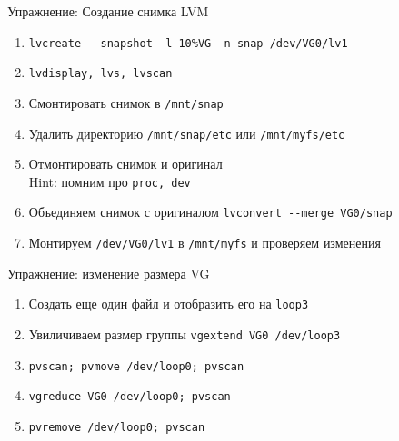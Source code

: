 \documentclass[ignorenonframetext, professionalfonts, hyperref={pdftex, unicode}]{beamer}
\begin{document}
\begin{frame}{Упражнение: Создание снимка LVM}
  \begin{enumerate}
    \item  {\tt lvcreate -\phantom{}-snapshot -l 10\%VG -n snap /dev/VG0/lv1}
    \item  {\tt lvdisplay, lvs, lvscan}
	\item Смонтировать снимок в {\tt /mnt/snap}
		\pause
	\item Удалить директорию {\tt /mnt/snap/etc} или {\tt /mnt/myfs/etc}
	\item Отмонтировать снимок и оригинал\\
		Hint: помним про {\tt proc, dev}
		\pause
	\item Объединяем снимок с оригиналом {\tt lvconvert -\phantom{}-merge VG0/snap}
	\item Монтируем {\tt /dev/VG0/lv1} в {\tt /mnt/myfs} и проверяем изменения
  \end{enumerate}
\end{frame}

\begin{frame}{Упражнение: изменение размера VG}
  \begin{enumerate}
	\item Создать еще один файл и отобразить его на {\tt loop3}
	\item Увиличиваем размер группы {\tt vgextend VG0 /dev/loop3}
		\pause
    \item  {\tt pvscan; pvmove /dev/loop0; pvscan}
    \item  {\tt vgreduce VG0 /dev/loop0; pvscan}
    \item  {\tt pvremove /dev/loop0; pvscan}
  \end{enumerate}
\end{frame}
\end{document}
